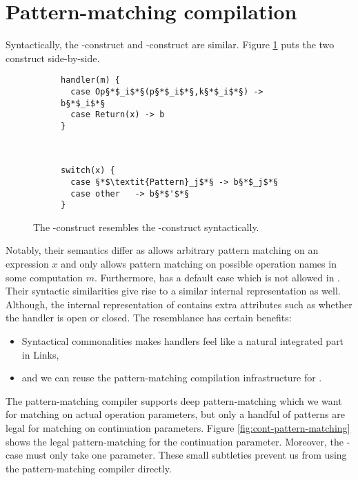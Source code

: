 \section{Pattern-matching compilation}
Syntactically, the -construct and -construct are similar. Figure \ref{fig:handler-switch} puts the two construct side-by-side.
\begin{figure}[h]
    \centering
    \begin{subfigure}[c]{0.45\textwidth}
        \centering
\begin{lstlisting}[style=links]
handler(m) {
  case Op§*$_i$*§(p§*$_i$*§,k§*$_i$*§) -> b§*$_i$*§
  case Return(x) -> b
}
\end{lstlisting}        
    \end{subfigure}%
    ~
    \begin{subfigure}[c]{0.45\textwidth}
        \centering
\begin{lstlisting}[style=links]
switch(x) {
  case §*$\textit{Pattern}_j$*§ -> b§*$_j$*§
  case other   -> b§*$'$*§
}
\end{lstlisting}       
    \end{subfigure}
\caption{The -construct resembles the -construct syntactically.}\label{fig:handler-switch}
\end{figure}
Notably, their semantics differ as  allows arbitrary pattern matching on an expression $x$ and  only allows pattern matching on possible operation names in some computation $m$. Furthermore,  has a default case  which is not allowed in . 
Their syntactic similarities give rise to a similar internal representation as well. Although, the internal representation of  contains extra attributes such as whether the handler is open or closed.
The resemblance has certain benefits:
\begin{itemize}
  \item Syntactical commonalities makes handlers feel like a natural integrated part in Links,
  \item and we can reuse the  pattern-matching compilation infrastructure for .
\end{itemize}
The  pattern-matching compiler supports deep pattern-matching which we want for matching on actual operation parameters, but only a handful of patterns are legal for matching on continuation parameters. Figure \ref{fig:cont-pattern-matching} shows the legal pattern-matching for the continuation parameter. Moreover, the -case must only take one parameter. These small subtleties prevent us from using the  pattern-matching compiler directly.

